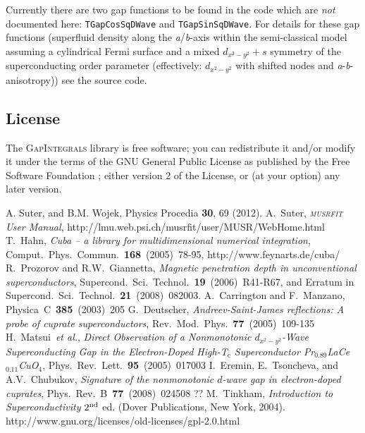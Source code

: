 \documentclass[twoside]{article}
\newcommand{\musrfit}{\textsc{musrfit}\xspace}
\newcommand{\gapint}{\textsc{GapIntegrals}\xspace}
\begin{document}
\noindent Currently there are two gap functions to be found in the code which are \emph{not} documented here: 
\verb?TGapCosSqDWave? and \verb?TGapSinSqDWave?. For details for these gap functions (superfluid density along the \textit{a}/\textit{b}-axis
within the semi-classical model assuming a cylindrical Fermi surface and a mixed $d_{x^2-y^2} + s$ symmetry of the superconducting order parameter 
(effectively: $d_{x^2-y^2}$ with shifted nodes and \textit{a}-\textit{b}-anisotropy)) see the source code.

\subsection*{License}
The \gapint library is free software; you can redistribute it and/or modify it under the terms of the GNU General Public License as published by the Free Software Foundation \cite{GPL}; either version 2 of the License, or (at your option) any later version.


\begin{thebibliography}{1}

 A. Suter, and B.M. Wojek, Physics Procedia \textbf{30}, 69 (2012). 
                  A.~Suter, \textit{\musrfit User Manual}, http://lmu.web.psi.ch/musrfit/user/MUSR/WebHome.html
 T.~Hahn, \textit{Cuba -- a library for multidimensional numerical integration}, Comput.~Phys.~Commun.~\textbf{168}~(2005)~78-95, http://www.feynarts.de/cuba/
 R.~Prozorov and R.W.~Giannetta, \textit{Magnetic penetration depth in unconventional superconductors}, Supercond.\ Sci.\ Technol.\ \textbf{19}~(2006)~R41-R67, and Erratum in Supercond.\ Sci.\ Technol.\ \textbf{21}~(2008)~082003.
 A.~Carrington and F.~Manzano, Physica~C~\textbf{385}~(2003)~205
 G.~Deutscher, \textit{Andreev-Saint-James reflections: A probe of cuprate superconductors}, Rev.~Mod.~Phys.~\textbf{77}~(2005)~109-135
 H.~Matsui~\textit{et al.}, \textit{Direct Observation of a Nonmonotonic $d_{x^2-y^2}$-Wave Superconducting Gap in the Electron-Doped High-T$_{\mathrm c}$ Superconductor Pr$_{0.89}$LaCe$_{0.11}$CuO$_4$}, Phys.~Rev.~Lett.~\textbf{95}~(2005)~017003
 I.~Eremin, E.~Tsoncheva, and A.V.~Chubukov, \textit{Signature of the nonmonotonic $d$-wave gap in electron-doped cuprates}, Phys.~Rev.~B~\textbf{77}~(2008)~024508
 ??
 M.~Tinkham, \textit{Introduction to Superconductivity} $2^{\rm nd}$ ed. (Dover Publications, New York, 2004).
 http://www.gnu.org/licenses/old-licenses/gpl-2.0.html

\end{thebibliography}
\end{document}
